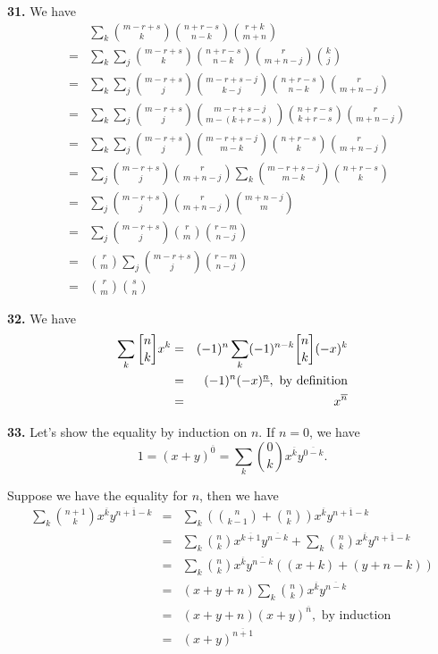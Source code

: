 \documentclass[a4paper,12pt]{article}
\newcommand{\newpar}[1]{\bigskip \noindent \textbf{#1.}}
\newcommand{\stirlingone}[2]{{#1 \atopwithdelims[]#2}}
\begin{document}
\newpar{31}  We have
\begin{eqnarray*}
  && \sum_k {m-r+s \choose k} {n+r-s \choose n-k} {r+k \choose
    m+n}\\
  &=& \sum_k \sum_j {m-r+s \choose k} {n+r-s \choose n-k}{r
    \choose m+n -j}{k \choose j} \\
  &=& \sum_k \sum_j {m-r+s \choose
    j}{m-r+s-j \choose k-j} {n+r-s \choose n-k} {r \choose m+n -j} \\
  &=& \sum_k \sum_j {m-r+s \choose j} {m-r+s -j \choose m-(k+r-s)}{n+r-s
    \choose k+r-s} {r \choose m+n - j} \\
  &=& \sum_k \sum_j {m-r+s \choose j} {m-r+s - j \choose m-k} {n+r-s
    \choose k} {r \choose m+n -j } \\
  &=& \sum_j {m-r+s \choose j} {r \choose m+n -j} \sum_k {m-r+s -j
    \choose m-k} {n+r-s \choose k} \\
  &=& \sum_j {m-r+s \choose j} {r \choose m+n - j} {m + n - j \choose
    m} \\
  &=& \sum_j {m-r + s \choose j} {r \choose m} {r -m \choose n - j} \\
  &=& {r \choose m} \sum_j {m-r+s \choose j} {r-m \choose n-j} \\
  &=& {r \choose m} {s \choose n}
\end{eqnarray*}

\newpar{32} We have
\begin{eqnarray*}
  \sum_k \stirlingone{n}{k} x^k &=& (-1)^n \sum_k
  (-1)^{n-k}\stirlingone{n}{k} (-x)^k \\
  &=& (-1)^n (-x)^{\underline{n}}, \mbox{ by definition} \\
  &=& x^{\overline{n}}
\end{eqnarray*}

\newpar{33} Let's show the equality by induction on $n$.  If $n=0$, we
have
\[ 1 = (x + y)^{\overline{0}} = \sum_k {0 \choose k} x^{\overline{k}}
y^{\overline{0-k}}.\]

Suppose we have the equality for $n$, then we have
\begin{eqnarray*}
  \sum_k {n+1 \choose k} x^{\overline{k}} y^{\overline{n+1-k}} &=&
  \sum_k \left( {n \choose k-1} + {n \choose k} \right)
  x^{\overline{k}} y^{\overline{n+1-k}} \\
  &=& \sum_k {n \choose k} x^{\overline{k+1}} y^{\overline{n-k}} +
  \sum_k {n \choose k} x^{\overline{k}} y^{\overline{n+1-k}} \\
  &=& \sum_k {n \choose k} x^{\overline{k}} y^{\overline{n-k}} ((x + k
  )+ (y + n - k)) \\
  &=& (x + y + n) \sum_k {n \choose k} x^{\overline{k}}
  y^{\overline{n-k}}\\
  &=& (x + y + n) (x+y)^{\overline{n}}, \mbox{ by induction} \\
  &=& (x + y)^{\overline{n+1}}
\end{eqnarray*}
\end{document}
